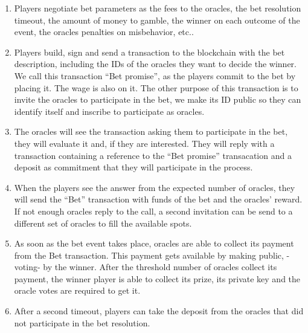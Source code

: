 \begin{enumerate}
  \item Players negotiate bet parameters as the fees to the oracles, the bet
      resolution timeout, the amount of money to gamble, the winner on each
      outcome of the event, the oracles penalties on misbehavior, etc..
  \item Players build, sign and send a transaction to the blockchain with the
      bet description, including the IDs of the oracles they want to decide the
      winner.
    We call this transaction ``Bet promise'', as the players commit to the bet
      by placing it. The wage is also on it.
    The other purpose of this transaction is to invite the oracles to
      participate in the bet, we make its ID public so they can identify itself
      and inscribe to participate as oracles.
  \item The oracles will see the transaction asking them to participate in the
      bet, they will evaluate it and, if they are interested.
    They will reply with a transaction containing a reference to the ``Bet
      promise'' transacation and a deposit as commitment that they will
      participate in the process.
  \item When the players see the answer from the expected number of oracles,
  	  they will send the ``Bet'' transaction with funds of the bet and the
  	  oracles' reward.
  	If not enough oracles reply to the call, a second invitation can be send to
  	  a different set of oracles to fill the available spots.
  \item As soon as the bet event takes place, oracles are able to collect its
  	  payment from the Bet transaction. This payment gets available by making
  	  public, -voting- by the winner.
  	After the threshold number of oracles collect its payment, the winner player
  	  is able to collect its prize, its private key and the oracle votes are
  	  required to get it.
  \item After a second timeout, players can take the deposit from the oracles
  	  that did not participate in the bet resolution.
\end{enumerate}

